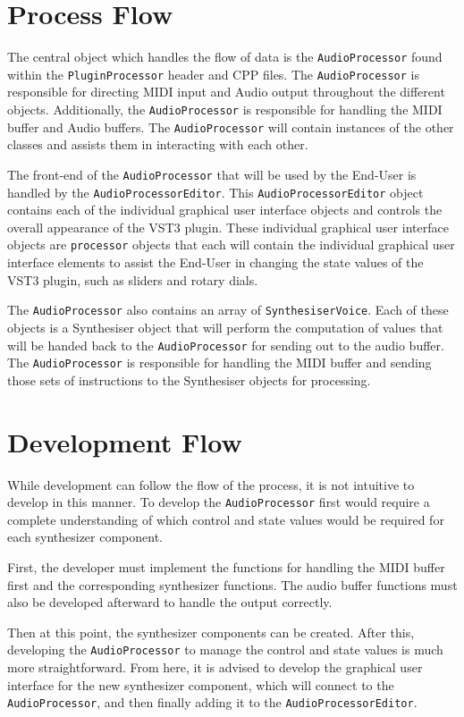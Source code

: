 \documentclass[a4paper,12pt]{report}
\begin{document}
\section{Process Flow}
\label{sec:processflow}
The central object which handles the flow of data is the \texttt{AudioProcessor} found within the \texttt{PluginProcessor} header and CPP files. The \texttt{AudioProcessor} is responsible for directing MIDI input and Audio output throughout the different objects. Additionally, the \texttt{AudioProcessor} is responsible for handling the MIDI buffer and Audio buffers. The \texttt{AudioProcessor} will contain instances of the other classes and assists them in interacting with each other.

The front-end of the \texttt{AudioProcessor} that will be used by the End-User is handled by the \texttt{AudioProcessorEditor}. This \texttt{AudioProcessorEditor} object contains each of the individual graphical user interface objects and controls the overall appearance of the VST3 plugin. These individual graphical user interface objects are \texttt{processor} objects that each will contain the individual graphical user interface elements to assist the End-User in changing the state values of the VST3 plugin, such as sliders and rotary dials.

The \texttt{AudioProcessor} also contains an array of \texttt{SynthesiserVoice}. Each of these objects is a Synthesiser object that will perform the computation of values that will be handed back to the \texttt{AudioProcessor}  for sending out to the audio buffer. The \texttt{AudioProcessor} is responsible for handling the MIDI buffer and sending those sets of instructions to the Synthesiser objects for processing.

\section{Development Flow}
\label{sec:devflow}
While development can follow the flow of the process, it is not intuitive to develop in this manner. To develop the \texttt{AudioProcessor} first would require a complete understanding of which control and state values would be required for each synthesizer component.

First, the developer must implement the functions for handling the MIDI buffer first and the corresponding synthesizer functions. The audio buffer functions must also be developed afterward to handle the output correctly.

Then at this point, the synthesizer components can be created. After this, developing the \texttt{AudioProcessor} to manage the control and state values is much more straightforward. From here, it is advised to develop the graphical user interface for the new synthesizer component, which will connect to the \texttt{AudioProcessor}, and then finally adding it to the \texttt{AudioProcessorEditor}.
\end{document}
